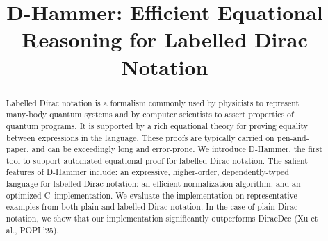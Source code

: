 \documentclass[runningheads]{llncs}
\newcommand{\CC}{C\nolinebreak\hspace{-.05em}\raisebox{.4ex}{\tiny\bf +}\nolinebreak\hspace{-.10em}\raisebox{.4ex}{\tiny\bf +}}
\def\CC{{C\nolinebreak[4]\hspace{-.05em}\raisebox{.4ex}{\tiny\bf ++}}}
\begin{document}
%
\title{D-Hammer: Efficient Equational Reasoning for Labelled Dirac Notation}
\author{}
\institute{}



%
\maketitle              %
%
\begin{abstract}
    Labelled Dirac notation is a formalism commonly used by physicists to represent many-body quantum systems and by computer scientists to assert properties of quantum programs. It is supported by a rich equational theory for proving equality between expressions in the language. These proofs are typically carried on pen-and-paper, and can be exceedingly long and error-prone. We introduce D-Hammer, the first tool to support automated equational proof for labelled Dirac notation. The salient features of D-Hammer include: an expressive, higher-order, dependently-typed language for labelled Dirac notation; an efficient normalization algorithm; and an optimized \CC\ implementation. We evaluate the implementation on representative examples from both plain and labelled Dirac notation. In the case of plain Dirac notation, we show that our implementation significantly outperforms DiracDec (Xu et al., POPL'25).
  


\end{abstract}
%
%
%
\end{document}
